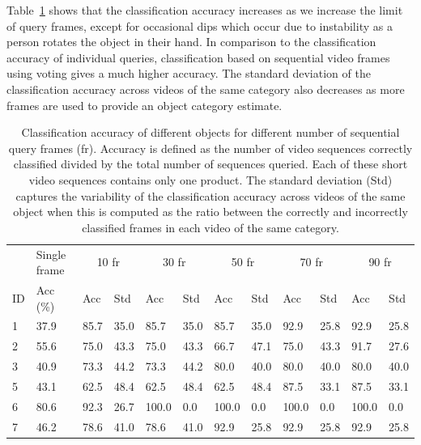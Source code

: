 Table~\ref{table:vfAnalysis7prods} shows that the classification accuracy increases as we increase the limit of query frames, except for occasional dips which occur due to instability as a person rotates the object in their hand. In comparison to the classification accuracy of individual queries, classification based on sequential video frames using voting gives a much higher accuracy. The standard deviation of the classification accuracy across videos of the same category also decreases as more frames are used to provide an object category estimate. 


\begin{table}[h!]
\centering
\begin{tabularx}{1.05\linewidth}{XXXXXXXXXXXX}
\toprule
& Single frame & \multicolumn{2}{c}{10 fr} & \multicolumn{2}{c}{30 fr} & \multicolumn{2}{c}{50 fr} & \multicolumn{2}{c}{70 fr} & \multicolumn{2}{c}{90 fr}\\
ID & Acc (\%) & Acc & Std & Acc & Std & Acc & Std & Acc & Std & Acc & Std \\
\midrule
1 & 37.9 & 85.7 & 35.0 & 85.7 & 35.0 & 85.7 & 35.0 & 92.9 & 25.8 & 92.9 & 25.8 \\
2 & 55.6 & 75.0 & 43.3 & 75.0 & 43.3 & 66.7 & 47.1 & 75.0 & 43.3 & 91.7 & 27.6\\
3 & 40.9 & 73.3 & 44.2 & 73.3 & 44.2 & 80.0 & 40.0 & 80.0 & 40.0 & 80.0 & 40.0\\
5 & 43.1 & 62.5 & 48.4 & 62.5 & 48.4 & 62.5 & 48.4 & 87.5 & 33.1  & 87.5 & 33.1\\
6 & 80.6 & 92.3 & 26.7 & 100.0 & 0.0 & 100.0 & 0.0 & 100.0 & 0.0  & 100.0 & 0.0\\
7 & 46.2 & 78.6 & 41.0 & 78.6 & 41.0 & 92.9 & 25.8 & 92.9 & 25.8  & 92.9 & 25.8\\
\bottomrule
\end{tabularx}
\caption{Classification accuracy of different objects for different number of sequential query frames (fr). Accuracy is defined as the number of video sequences correctly classified divided by the total number of sequences queried. Each of these short video sequences contains only one product. The standard deviation (Std) captures the variability of the classification accuracy across videos of the same object when this is computed as the ratio between the correctly and incorrectly classified frames in each video of the same category.}
\label{table:vfAnalysis7prods}
\end{table}






